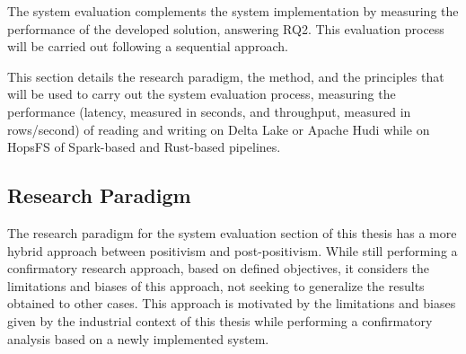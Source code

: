 The system evaluation complements the system implementation by measuring the performance of the developed solution, answering RQ2. This evaluation process will be carried out following a sequential approach.

This section details the research paradigm, the method, and the principles that will be used to carry out the system evaluation process, measuring the performance (latency, measured in seconds, and throughput, measured in rows/second) of reading and writing on Delta Lake or Apache Hudi while on \gls{HopsFS} of Spark-based and Rust-based pipelines. 

\subsection{Research Paradigm}
The research paradigm for the system evaluation section of this thesis has a more hybrid approach between positivism and post-positivism. While still performing a confirmatory research approach, based on defined objectives, it considers the limitations and biases of this approach, not seeking to generalize the results obtained to other cases. This approach is motivated by the limitations and biases given by the industrial context of this thesis while performing a confirmatory analysis based on a newly implemented system.

